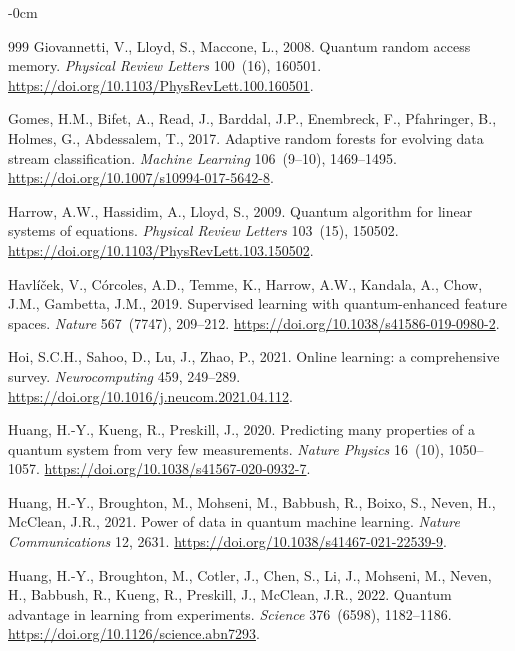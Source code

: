 \documentclass[sensors,article,submit,pdftex,moreauthors]{Definitions/mdpi}
\begin{document}
\begin{adjustwidth}{-\extralength}{0cm}
\begin{thebibliography}{999}
Giovannetti, V., Lloyd, S., Maccone, L., 2008.
\newblock Quantum random access memory.
\newblock \emph{Physical Review Letters} 100~(16), 160501.
\newblock \url{https://doi.org/10.1103/PhysRevLett.100.160501}.

Gomes, H.M., Bifet, A., Read, J., Barddal, J.P., Enembreck, F., Pfahringer, B., Holmes, G., Abdessalem, T., 2017.
\newblock Adaptive random forests for evolving data stream classification.
\newblock \emph{Machine Learning} 106~(9--10), 1469--1495.
\newblock \url{https://doi.org/10.1007/s10994-017-5642-8}.

Harrow, A.W., Hassidim, A., Lloyd, S., 2009.
\newblock Quantum algorithm for linear systems of equations.
\newblock \emph{Physical Review Letters} 103~(15), 150502.
\newblock \url{https://doi.org/10.1103/PhysRevLett.103.150502}.

Havl\'i\v{c}ek, V., C\'orcoles, A.D., Temme, K., Harrow, A.W., Kandala, A., Chow, J.M., Gambetta, J.M., 2019.
\newblock Supervised learning with quantum-enhanced feature spaces.
\newblock \emph{Nature} 567~(7747), 209--212.
\newblock \url{https://doi.org/10.1038/s41586-019-0980-2}.

Hoi, S.C.H., Sahoo, D., Lu, J., Zhao, P., 2021.
\newblock Online learning: a comprehensive survey.
\newblock \emph{Neurocomputing} 459, 249--289.
\newblock \url{https://doi.org/10.1016/j.neucom.2021.04.112}.

Huang, H.-Y., Kueng, R., Preskill, J., 2020.
\newblock Predicting many properties of a quantum system from very few measurements.
\newblock \emph{Nature Physics} 16~(10), 1050--1057.
\newblock \url{https://doi.org/10.1038/s41567-020-0932-7}.

Huang, H.-Y., Broughton, M., Mohseni, M., Babbush, R., Boixo, S., Neven, H., McClean, J.R., 2021.
\newblock Power of data in quantum machine learning.
\newblock \emph{Nature Communications} 12, 2631.
\newblock \url{https://doi.org/10.1038/s41467-021-22539-9}.

Huang, H.-Y., Broughton, M., Cotler, J., Chen, S., Li, J., Mohseni, M., Neven, H., Babbush, R., Kueng, R., Preskill, J., McClean, J.R., 2022.
\newblock Quantum advantage in learning from experiments.
\newblock \emph{Science} 376~(6598), 1182--1186.
\newblock \url{https://doi.org/10.1126/science.abn7293}.


\end{thebibliography}
\end{adjustwidth}
\end{document}
